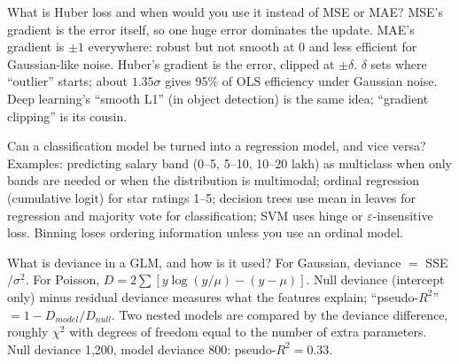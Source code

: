 \begin{qa}{\deep What is Huber loss and when would you use it instead of MSE or MAE?}
\why MSE's gradient is the error itself, so one huge error dominates the update. MAE's gradient is $\pm1$ everywhere: robust
but not smooth at 0 and less efficient for Gaussian-like noise. Huber's gradient is the error, clipped at $\pm\delta$. $\delta$
sets where ``outlier'' starts; about $1.35\sigma$ gives 95\% of OLS efficiency under Gaussian noise. Deep learning's ``smooth
L1'' (in object detection) is the same idea; ``gradient clipping'' is its cousin.
\end{qa}

\begin{qa}{\deep Can a classification model be turned into a regression model, and vice versa?}
\why Examples: predicting salary band (0--5, 5--10, 10--20 lakh) as multiclass when only bands are needed or when the
distribution is multimodal; ordinal regression (cumulative logit) for star ratings 1--5; decision trees use mean in leaves
for regression and majority vote for classification; SVM uses hinge or $\varepsilon$-insensitive loss. Binning loses ordering
information unless you use an ordinal model.
\end{qa}

\begin{qa}{What is deviance in a GLM, and how is it used?}
\why For Gaussian, deviance $=$ SSE$/\sigma^2$. For Poisson, $D = 2\sum[y\log(y/\mu) - (y - \mu)]$. Null deviance (intercept only)
minus residual deviance measures what the features explain; ``pseudo-$R^2$'' $= 1 - D_{model}/D_{null}$. Two nested models are
compared by the deviance difference, roughly $\chi^2$ with degrees of freedom equal to the number of extra parameters.
\worked Null deviance 1{,}200, model deviance 800: pseudo-$R^2 = 0.33$.
\end{qa}

